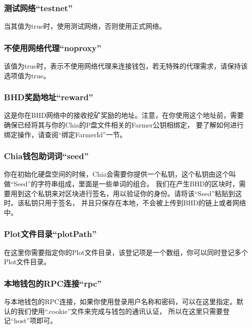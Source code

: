 \subsubsection{测试网络``testnet''}
\begin{flushleft}
    当其值为true时，使用测试网络，否则使用正式网络。
\end{flushleft}
\subsubsection{不使用网络代理``noproxy''}
\begin{flushleft}
    该值为true时，表示不使用网络代理来连接钱包，若无特殊的代理需求，请保持该选项值为true。
\end{flushleft}
\subsubsection{BHD奖励地址``reward''}
\begin{flushleft}
    这是你在BHD网络中的接收挖矿奖励的地址。注意，在你使用这个地址前，需要确保已经将其与你的Chia的P盘文件相关的Farmer公钥相绑定，
    要了解如何进行绑定操作，请查阅``绑定FarmerId''一节。
\end{flushleft}
\subsubsection{Chia钱包助词词``seed''}
\begin{flushleft}
    你在初始化硬盘空间的时候，Chia会需要你提供一个私钥，这个私钥由这个叫做``Seed''的字符串组成，里面是一些单词的组合。
    我们在产生BHD的区块时，需要用到这个私钥来对区块进行签名，用以验证你的身份。请将该``Seed''粘贴到这时。该私钥只用于签名，
    并且只保存在本地，不会被上传到BHD的链上或者网络中。
\end{flushleft}
\subsubsection{Plot文件目录``plotPath''}
\begin{flushleft}
    在这里你需要指定你的Plot文件目录，该登记项是一个数组，你可以同时登记多个Plot文件目录。
\end{flushleft}
\subsubsection{本地钱包的RPC连接``rpc''}
\begin{flushleft}
    与本地钱包的RPC连接，如果你使用登录用户名称和密码，可以在这里指定。默认的我们使用``.cookie''文件来完成与钱包的通讯认证，
    所以在这里只需要登记``host''项即可。
\end{flushleft}
